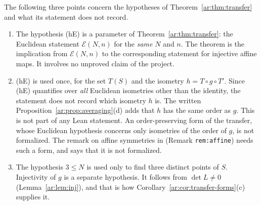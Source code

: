 \begin{remark}\label{ar:rem:hE}
The following three points concern the hypotheses of Theorem~\ref{ar:thm:transfer} and what its statement does not
record.
\begin{enumerate}[label=(\arabic*)]
\item The hypothesis (hE) is a parameter of Theorem~\ref{ar:thm:transfer}: the Euclidean statement $\mathcal E(N,n)$
for the \emph{same} $N$ and $n$. The theorem is the implication from $\mathcal E(N,n)$ to the corresponding statement
for injective affine maps. It involves no unproved claim of the project.
\item (hE) is used once, for the set $T(S)$ and the isometry $h=T\circ g\circ T'$. Since (hE) quantifies over
\emph{all} Euclidean isometries other than the identity, the statement does not record which isometry $h$ is. The
written Proposition~\ref{ar:prop:averaging}(d) adds that $h$ has the same order as $g$. This is not part of any Lean
statement. An order-preserving form of the transfer, whose Euclidean hypothesis concerns only isometries of the order
of $g$, is not formalized. The remark on affine symmetries in  (Remark \texttt{rem:affine})
needs such a form, and says that it is not formalized.
\item The hypothesis $3\le N$ is used only to find three distinct points of $S$. Injectivity of $g$ is a separate
hypothesis. It follows from $\det L\ne0$ (Lemma~\ref{ar:lem:inj}), and that is how
Corollary~\ref{ar:cor:transfer-forms}(c) supplies it.
\end{enumerate}
\end{remark}


